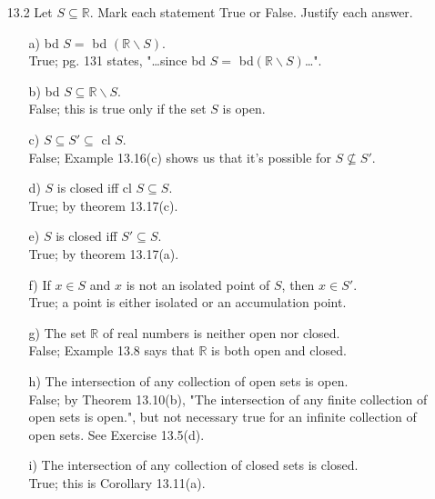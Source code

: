 \documentclass[12pt]{article}
\begin{document}
\begin{enumerate}
\begin{enumerate}

\item[13.2] Let $S \subseteq \mathbb{R}$. Mark each statement True or False. Justify each answer.
\begin{enumerate}
\item[a)] bd $S = $ bd $(\mathbb{R}\backslash S)$. \\
True; pg. 131 states, "\ldots since bd $S = $ bd$(\mathbb{R}\backslash S)$\ldots".
\item[b)] bd $S \subseteq \mathbb{R}\backslash S$. \\
False; this is true only if the set $S$ is open.
\item[c)] $S \subseteq S' \subseteq $ cl $S$. \\
False; Example 13.16(c) shows us that it's possible for $S \not\subseteq S'$.
\item[d)] $S$ is closed iff cl $S \subseteq S$. \\
True; by theorem 13.17(c).
\item[e)] $S$ is closed iff $S' \subseteq S$. \\
True; by theorem 13.17(a).
\item[f)] If $x \in S$ and $x$ is not an isolated point of $S$, then $x \in S'$. \\
True; a point is either isolated or an accumulation point.
\item[g)] The set $\mathbb{R}$ of real numbers is neither open nor closed. \\
False; Example 13.8 says that $\mathbb{R}$ is both open and closed.
\item[h)] The intersection of any collection of open sets is open. \\
False; by Theorem 13.10(b), "The intersection of any finite collection of open sets is open.",
but not necessary true for an infinite collection of open sets. See Exercise 13.5(d).
\item[i)] The intersection of any collection of closed sets is closed. \\
True; this is Corollary 13.11(a).
\end{enumerate}


\end{enumerate}
\end{enumerate}
\end{document}
